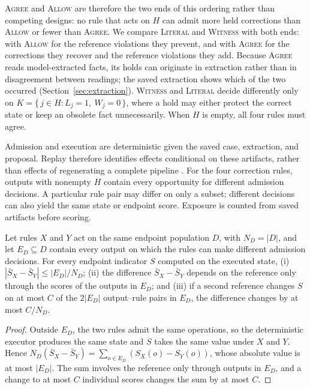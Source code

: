 \documentclass[acmsmall,review,anonymous]{acmart}
\newcommand{\agree}{\textsc{Agree}}
\newcommand{\allow}{\textsc{Allow}}
\newcommand{\literal}{\textsc{Literal}}
\newcommand{\witness}{\textsc{Witness}}
\begin{document}
\agree{} and \allow{} are therefore the two ends of this ordering rather than competing designs: no rule that acts on $H$ can admit more held corrections than \allow{} or fewer than \agree{}. We compare \literal{} and \witness{} with both ends: with \allow{} for the reference violations they prevent, and with \agree{} for the corrections they recover and the reference violations they add. Because \agree{} reads model-extracted facts, its holds can originate in extraction rather than in disagreement between readings; the saved extraction shows which of the two occurred (Section~\ref{sec:extraction}). \witness{} and \literal{} decide differently only on $K=\{\,j\in H : L_j=1,\ W_j=0\,\}$, where a hold may either protect the correct state or keep an obsolete fact unnecessarily. When $H$ is empty, all four rules must agree.

Admission and execution are deterministic given the saved case, extraction, and proposal. Replay therefore identifies effects conditional on these artifacts, rather than effects of regenerating a complete pipeline \cite{cite53}. For the four correction rules, outputs with nonempty $H$ contain every opportunity for different admission decisions. A particular rule pair may differ on only a subset; different decisions can also yield the same state or endpoint score. Exposure is counted from saved artifacts before scoring.

\begin{proposition}\label{prop:1}
Let rules $X$ and $Y$ act on the same endpoint population $D$, with $N_D=|D|$, and let $E_D\subseteq D$ contain every output on which the rules can make different admission decisions. For every endpoint indicator $S$ computed on the executed state, (i) $|\bar S_X-\bar S_Y|\le |E_D|/N_D$; (ii) the difference $\bar S_X-\bar S_Y$ depends on the reference only through the scores of the outputs in $E_D$; and (iii) if a second reference changes $S$ on at most $C$ of the $2|E_D|$ output--rule pairs in $E_D$, the difference changes by at most $C/N_D$.
\end{proposition}
\begin{proof}
Outside $E_D$, the two rules admit the same operations, so the deterministic executor produces the same state and $S$ takes the same value under $X$ and $Y$. Hence $N_D(\bar S_X-\bar S_Y)=\sum_{o\in E_D}(S_X(o)-S_Y(o))$, whose absolute value is at most $|E_D|$. The sum involves the reference only through outputs in $E_D$, and a change to at most $C$ individual scores changes the sum by at most $C$.
\end{proof}
\end{document}
